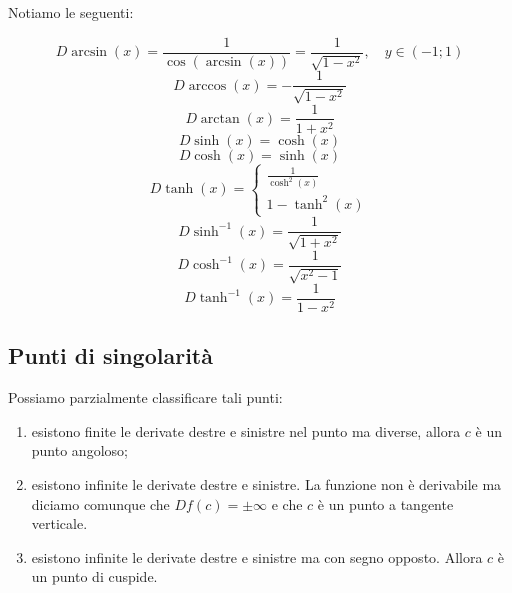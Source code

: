 \documentclass[a4paper]{article}
\begin{document}

\pagebreak

Notiamo le seguenti:

\[
    D\arcsin(x) = \frac{1}{\cos(\arcsin(x))}
    = \frac{1}{\sqrt{1 - x^2}}, \quad y \in (-1;1)
\]
\[
    D\arccos(x) = -\frac{1}{\sqrt{1 - x^2}}
\]
\[
    D\arctan(x) = \frac{1}{1+x^2}
\]
\[
    D\sinh(x) = \cosh(x)
\]
\[
    D\cosh(x) = \sinh(x)
\]
\[
    D\tanh(x) = \begin{cases}
        \frac{1}{\cosh^2(x)} \\
        1 - \tanh^2(x)
    \end{cases}
\]
\[
    D\sinh^{-1}(x) = \frac{1}{\sqrt{1 + x^2}}
\]
\[
    D\cosh^{-1}(x) = \frac{1}{\sqrt{x^2 - 1}}
\]
\[
    D\tanh^{-1}(x) = \frac{1}{1-x^2}
\]

\subsection{Punti di singolarità}


Possiamo parzialmente classificare tali punti:
\begin{enumerate}
    \item esistono finite le derivate destre e sinistre nel punto ma diverse, allora
        \(c\) è un punto angoloso;
    \item esistono infinite le derivate destre e sinistre. La funzione non è derivabile ma diciamo
    comunque che \(Df(c) = \pm \infty\) e che \(c\) è un punto a tangente verticale.
    \item esistono infinite le derivate destre e sinistre ma con segno opposto.
        Allora \(c\) è un punto di cuspide.
\end{enumerate}
\end{document}
